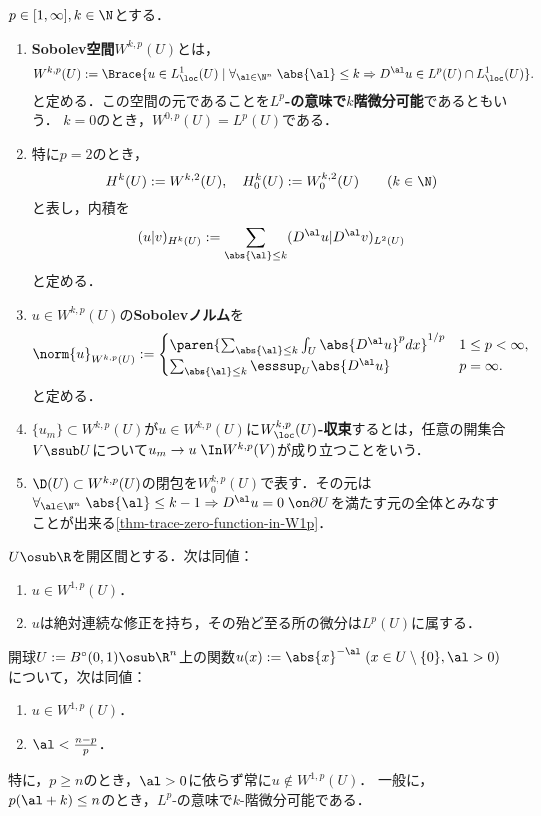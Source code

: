 \documentclass[uplatex,dvipdfmx]{jsreport}
\begin{document}
\begin{definition}
    $p\in[1,\infty],k\in\N$とする．
    \begin{enumerate}
        \item \textbf{Sobolev空間}$W^{k,p}(U)$とは，
        \[W^{k,p}(U):=\Brace{u\in L^1_\loc(U)\mid \forall_{\al\in\N^n}\;\abs{\al}\le k\Rightarrow D^\al u\in L^p(U)\cap L^1_\loc(U)}.\]
        と定める．この空間の元であることを\textbf{$L^p$-の意味で$k$階微分可能}であるともいう．
        $k=0$のとき，$W^{0,p}(U)=L^p(U)$である．
        \item 特に$p=2$のとき，
        \[H^k(U):=W^{k,2}(U),\quad H^k_0(U):=W^{k,2}_0(U)\qquad(k\in\N)\]
        と表し，内積を
        \[(u|v)_{H^k(U)}:=\sum_{\abs{\al}\le k}(D^\al u|D^\al v)_{L^2(U)}\]
        と定める．
        \item $u\in W^{k,p}(U)$の\textbf{Sobolevノルム}を
        \[\norm{u}_{W^{k,p}(U)}:=\begin{cases}
            \paren{\sum_{\abs{\al}\le k}\int_U\abs{D^\al u}^pdx}^{1/p}&1\le p<\infty,\\
            \sum_{\abs{\al}\le k}\esssup_U\abs{D^\al u}&p=\infty.
        \end{cases}\]
        と定める．
        \item $\{u_m\}\subset W^{k,p}(U)$が$u\in W^{k,p}(U)$に\textbf{$W^{k,p}_\loc(U)$-収束}するとは，任意の開集合$V\ssub U$について$u_m\to u\;\In W^{k,p}(V)$が成り立つことをいう．
        \item $\D(U)\subset W^{k,p}(U)$の閉包を$W_0^{k,p}(U)$で表す．その元は$\forall_{\al\in\N^n}\;\abs{\al}\le k-1\Rightarrow D^\al u=0\;\on\partial U$を満たす元の全体とみなすことが出来る\ref{thm-trace-zero-function-in-W1p}．
    \end{enumerate}
\end{definition}

\begin{example}[1次元の場合は簡単な特徴付けが存在する]
    $U\osub\R$を開区間とする．次は同値：
    \begin{enumerate}
        \item $u\in W^{1,p}(U)$．
        \item $u$は絶対連続な修正を持ち，その殆ど至る所の微分は$L^p(U)$に属する．
    \end{enumerate}
\end{example}

\begin{example}
    開球$U:=B^\circ(0,1)\osub\R^n$上の関数$u(x):=\abs{x}^{-\al}\;(x\in U\setminus\{0\},\al>0)$について，次は同値：
    \begin{enumerate}
        \item $u\in W^{1,p}(U)$．
        \item $\al<\frac{n-p}{p}$．
    \end{enumerate}
    特に，$p\ge n$のとき，$\al>0$に依らず常に$u\notin W^{1,p}(U)$．
    一般に，$p(\al+k)\le n$のとき，$L^p$-の意味で$k$-階微分可能である．
\end{example}
\end{document}
